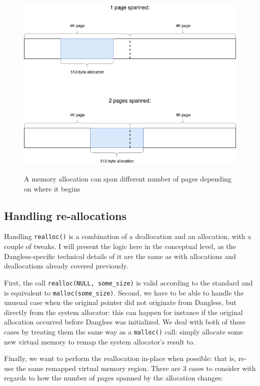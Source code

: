 \begin{figure}
	\centering
	\includegraphics[width=\textwidth]{diagrams/allocation_spanned_pages.png}
	\label{fig:allocation-spanned-pages}
	\caption{A memory allocation can span different number of pages depending on where it begins}
\end{figure}

\subsection{Handling re-allocations}

Handling \lstinline!realloc()! is a combination of a deallocation and an allocation, with a couple of tweaks. I will present the logic here in the conceptual level, as the Dangless-specific technical details of it are the same as with allocations and deallocations already covered previously.

First, the call \lstinline!realloc(NULL, some_size)! is valid according to the standard and is equivalent to \lstinline!malloc(some_size)!. Second, we have to be able to handle the unusual case when the original pointer did not originate from Dangless, but directly from the system allocator: this can happen for instance if the original allocation occurred before Dangless was initialized. We deal with both of these cases by treating them the same way as a \lstinline!malloc()! call: simply allocate some new virtual memory to remap the system allocator's result to.

Finally, we want to perform the reallocation in-place when possible: that is, re-use the same remapped virtual memory region. There are 3 cases to consider with regards to how the number of pages spanned by the allocation changes:

